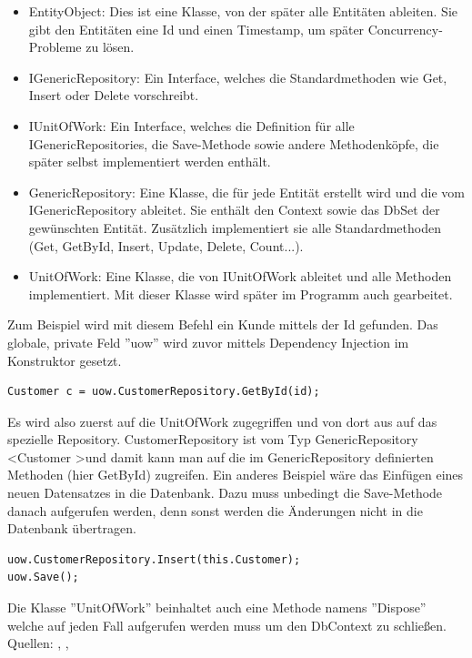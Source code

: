 \begin{itemize}
\item EntityObject: Dies ist eine Klasse, von der später alle Entitäten ableiten. Sie gibt den Entitäten eine Id und einen Timestamp, um später Concurrency-Probleme zu lösen.
\item IGenericRepository: Ein Interface, welches die Standardmethoden wie Get, Insert oder Delete vorschreibt.
\item IUnitOfWork: Ein Interface, welches die Definition für alle IGenericRepositories, die Save-Methode sowie andere Methodenköpfe, die später selbst implementiert werden enthält.
\item GenericRepository: Eine Klasse, die für jede Entität erstellt wird und die vom IGenericRepository ableitet. Sie enthält den Context sowie das DbSet der gewünschten Entität. Zusätzlich implementiert sie alle Standardmethoden (Get, GetById, Insert, Update, Delete, Count...).
\item UnitOfWork: Eine Klasse, die von IUnitOfWork ableitet und alle Methoden implementiert. Mit dieser Klasse wird später im Programm auch gearbeitet. 
\end{itemize}
Zum Beispiel wird mit diesem Befehl ein Kunde mittels der Id gefunden. Das globale, private Feld ''uow'' wird zuvor mittels Dependency Injection im Konstruktor gesetzt.
\begin{lstlisting}
Customer c = uow.CustomerRepository.GetById(id);
\end{lstlisting}
Es wird also zuerst auf die UnitOfWork zugegriffen und von dort aus auf das spezielle Repository. CustomerRepository ist vom Typ GenericRepository \textless Customer  \textgreater und damit kann man auf die im GenericRepository definierten Methoden (hier GetById) zugreifen.
\newline
Ein anderes Beispiel wäre das Einfügen eines neuen Datensatzes in die Datenbank. Dazu muss unbedingt die Save-Methode danach aufgerufen werden, denn sonst werden die Änderungen nicht in die Datenbank übertragen.
\begin{lstlisting}
uow.CustomerRepository.Insert(this.Customer);
uow.Save();
\end{lstlisting}
Die Klasse ''UnitOfWork'' beinhaltet auch eine Methode namens ''Dispose'' welche auf jeden Fall aufgerufen werden muss um den DbContext zu schließen.
\newline Quellen: \cite{codeproject_unit_2018}, \cite{dofactory_.net_2018}, \cite{c-sharpcorner_unit_2018}
